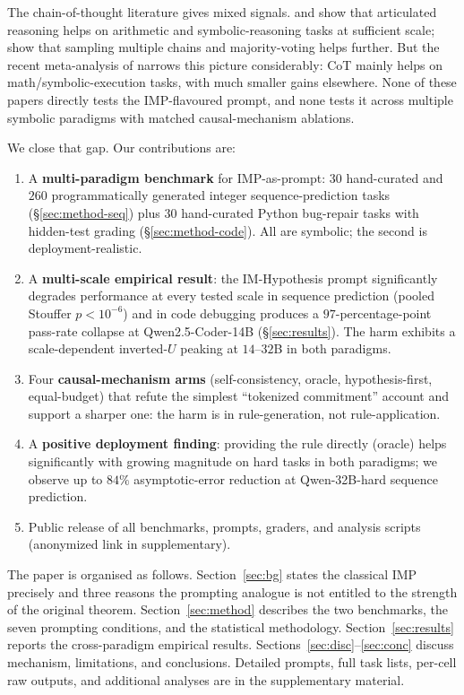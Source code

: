 \documentclass{article}
\begin{document}
The chain-of-thought literature gives mixed signals.
\citet{wei2022chain} and \citet{kojima2022zero} show that
articulated reasoning helps on arithmetic and symbolic-reasoning
tasks at sufficient scale; \citet{wang2023self} show that sampling
multiple chains and majority-voting helps further.  But the recent
meta-analysis of \citet{sprague2024cot} narrows this picture
considerably:  CoT mainly helps on math/symbolic-execution tasks,
with much smaller gains elsewhere.  None of these papers directly
tests the IMP-flavoured prompt, and none tests it across multiple
symbolic paradigms with matched causal-mechanism ablations.

We close that gap.  Our contributions are:

\begin{enumerate}[leftmargin=1.5em, itemsep=2pt, topsep=2pt]
\item A \textbf{multi-paradigm benchmark} for IMP-as-prompt:
$30$ hand-curated and $260$ programmatically generated integer
sequence-prediction tasks (\S\ref{sec:method-seq}) plus $30$
hand-curated Python bug-repair tasks with hidden-test grading
(\S\ref{sec:method-code}).  All are symbolic; the second is
deployment-realistic.
\item A \textbf{multi-scale empirical result}:  the IM-Hypothesis
prompt significantly degrades performance at every tested scale in
sequence prediction (pooled Stouffer $p < 10^{-6}$) and in code
debugging produces a $97$-percentage-point pass-rate collapse at
Qwen2.5-Coder-14B (\S\ref{sec:results}).  The harm exhibits a
scale-dependent inverted-$U$ peaking at $14$--$32$B in both paradigms.
\item Four \textbf{causal-mechanism arms} (self-consistency,
oracle, hypothesis-first, equal-budget) that refute the simplest
``tokenized commitment'' account and support a sharper one:  the
harm is in rule-generation, not rule-application.
\item A \textbf{positive deployment finding}:  providing the rule
directly (oracle) helps significantly with growing magnitude on
hard tasks in both paradigms; we observe up to $84\%$
asymptotic-error reduction at Qwen-32B-hard sequence prediction.
\item Public release of all benchmarks, prompts, graders, and
analysis scripts (anonymized link in supplementary).
\end{enumerate}

The paper is organised as follows.  Section~\ref{sec:bg} states the
classical IMP precisely and three reasons the prompting analogue
is not entitled to the strength of the original theorem.
Section~\ref{sec:method} describes the two benchmarks, the seven
prompting conditions, and the statistical methodology.
Section~\ref{sec:results} reports the cross-paradigm empirical
results.  Sections~\ref{sec:disc}--\ref{sec:conc} discuss
mechanism, limitations, and conclusions.  Detailed prompts, full
task lists, per-cell raw outputs, and additional analyses are in
the supplementary material.
\end{document}
